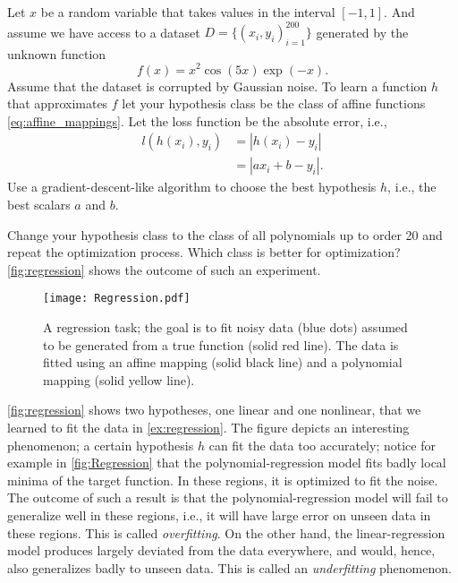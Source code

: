\begin{boxedexample}[Regression] \complementary{\theexample}
    \label{ex:regression}
    Let $x$ be a random variable that takes values in the interval $[-1,1]$. And assume we
    have access to a dataset $D = \{(x_i, y_i)_{i=1}^{200}\}$ generated by the unknown
    function 
    $$
    f(x) = x^2 \cos(5x) \exp(-x).
    $$ 
    Assume that the dataset is corrupted by Gaussian noise.
    To learn a function $h$ that approximates $f$ let your hypothesis class be
    the class of affine functions \eqref{eq:affine_mappings}. Let the loss
    function be the absolute error, i.e., 
    \begin{align*}
    l(h(x_i), y_i) &= |h(x_i)- y_i| \\
& = |ax_i + b - y_i|.
    \end{align*}
    Use a gradient-descent-like algorithm to choose the best hypothesis $h$,
    i.e., the best scalars $a$ and $b$. 

    Change your hypothesis class to the class of all polynomials up to   order
    20 and repeat the optimization process. Which class is better for
    optimization? \autoref{fig:regression} shows the outcome of such an experiment.
\end{boxedexample}
\begin{figure}[htbp]
    \centering
    \texttt{[image: Regression.pdf]}
    \caption{A regression task; the goal is to fit noisy data (blue dots) assumed to be generated from a true function (solid red line). The data is fitted using an affine mapping (solid black line) and a polynomial mapping (solid yellow line).}
    \label{fig:regression}
\end{figure}   

\begin{boxedexample}[Classification] \complementary{\theexample}
    \label{ex:classification}
\end{boxedexample}

\autoref{fig:regression} shows two hypotheses, one linear and one nonlinear, that we learned to fit the data in
\autoref{ex:regression}. The figure depicts an interesting phenomenon; a certain
hypothesis $h$ can fit the data too accurately; notice for example in
\autoref{fig:Regression} that the polynomial-regression model fits badly local
minima of the target function. In these regions, it is optimized to fit the
noise. The outcome of such a result is that the polynomial-regression model will
fail to generalize well in these regions, i.e., it will have large error on
unseen data in these regions. This is called \emph{overfitting}.
On the other hand, the linear-regression model produces largely deviated from
the data everywhere, and would, hence, also generalizes badly to unseen data.
This is called an \emph{underfitting} phenomenon. 

